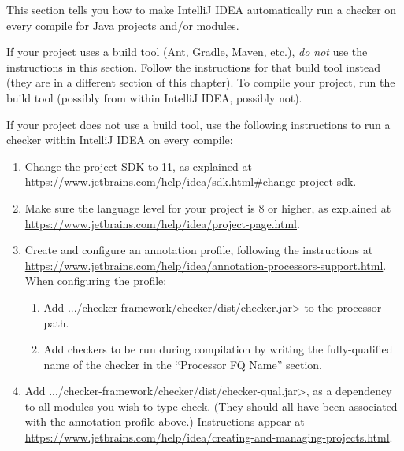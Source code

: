 
This section tells you how to make IntelliJ IDEA automatically run a
checker on every compile for Java projects and/or modules.

If your project uses a build tool (Ant, Gradle, Maven, etc.), \emph{do not}
use the instructions in this section.
Follow the instructions for that build tool instead (they are in
a different section of this chapter).  To compile your project, run the
build tool (possibly from within IntelliJ IDEA, possibly not).



If your project does not use a build tool, use the following instructions
to run a checker within IntelliJ IDEA on every compile:

\begin{enumerate}

\item Change the project SDK to 11, as explained at
  \url{https://www.jetbrains.com/help/idea/sdk.html#change-project-sdk}.

\item Make sure the language level for your project is 8 or higher, as explained at
\url{https://www.jetbrains.com/help/idea/project-page.html}.

\item Create and configure an annotation profile, following the instructions at \url{https://www.jetbrains.com/help/idea/annotation-processors-support.html}.
When configuring the profile:
\begin{enumerate}
\item Add \<.../checker-framework/checker/dist/checker.jar> to the processor path.
\item Add checkers to be run during compilation by writing the
  fully-qualified name of the checker in the ``Processor FQ Name''
  section.
\end{enumerate}

\item Add \<.../checker-framework/checker/dist/checker-qual.jar>, as a dependency to all
modules you wish to type check. (They should all have been associated with
the annotation profile above.)
Instructions appear at
\url{https://www.jetbrains.com/help/idea/creating-and-managing-projects.html}.

\end{enumerate}

